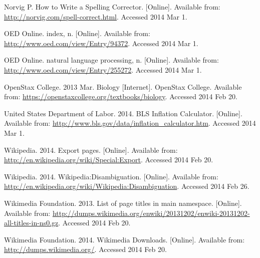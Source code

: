 \begin{thebibliography}{99}
Norvig P. How to Write a Spelling Corrector. [Online]. Available from: \url{http://norvig.com/spell-correct.html}. Accessed 2014 Mar 1.

OED Online. index, n. [Online]. Available from: \url{http://www.oed.com/view/Entry/94372}. Accessed 2014 Mar 1.

OED Online. natural language processing, n. [Online]. Available from: \url{http://www.oed.com/view/Entry/255272}. Accessed 2014 Mar 1.

OpenStax College. 2013 Mar. Biology [Internet]. OpenStax College. Available from: \url{https://openstaxcollege.org/textbooks/biology}. Accessed 2014 Feb 20.

United States Department of Labor. 2014. BLS Inflation Calculator. [Online]. Available from: \url{http://www.bls.gov/data/inflation_calculator.htm}. Accessed 2014 Mar 1.

Wikipedia. 2014. Export pages. [Online]. Available from: \url{http://en.wikipedia.org/wiki/Special:Export}. Accessed 2014 Feb 20.

Wikipedia. 2014. Wikipedia:Disambiguation. [Online]. Available from: \url{http://en.wikipedia.org/wiki/Wikipedia:Disambiguation}. Accessed 2014 Feb 26.

Wikimedia Foundation. 2013. List of page titles in main namespace. [Online]. Available from: \url{http://dumps.wikimedia.org/enwiki/20131202/enwiki-20131202-all-titles-in-ns0.gz}. Accessed 2014 Feb 20.

Wikimedia Foundation. 2014. Wikimedia Downloads. [Online]. Available from: \url{http://dumps.wikimedia.org/}. Accessed 2014 Feb 20.

\end{thebibliography}
